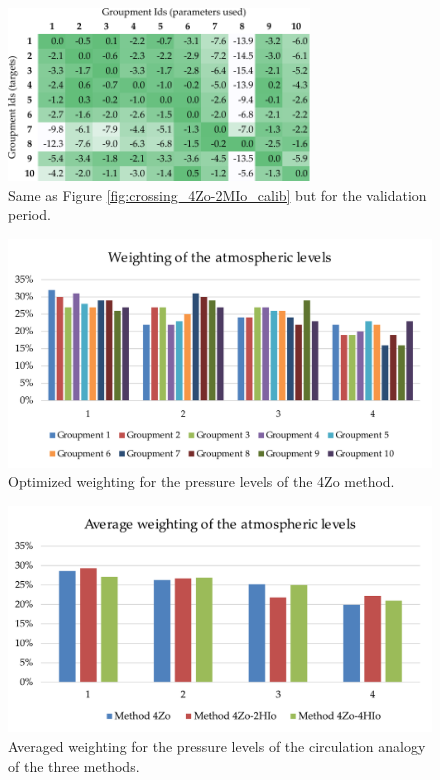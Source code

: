 \documentclass[5p]{elsarticle}
\begin{document}
\begin{figure}[htb]
	\centerline{\includegraphics[width=8cm]{figures/table_crossing_z4-hi2_valid.pdf}}
	\caption{Same as Figure \ref{fig:crossing_4Zo-2MIo_calib} but for the validation period.}
	\label{fig:crossing_4Zo-2MIo_valid}
\end{figure}

\begin{figure}[htb]
	\centerline{\includegraphics[width=\linewidth]{figures/figure_levels_weights.pdf}}
	\caption{Optimized weighting for the pressure levels of the 4Zo method.}
	\label{fig:levels_weights}
\end{figure}

\begin{figure}[htb]
	\centerline{\includegraphics[width=\linewidth]{figures/figure_levels_weights_average.pdf}}
	\caption{Averaged weighting for the pressure levels of the circulation analogy of the three methods.}
	\label{fig:levels_weights_average}
\end{figure}
\end{document}

